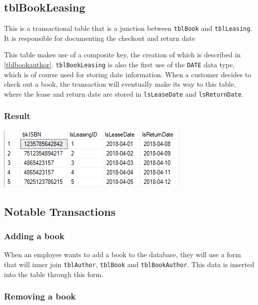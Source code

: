 \documentclass[11pt,a4paper]{scrartcl}
\begin{document}
	\subsection{tblBookLeasing}\label{tblbookleasing}
	
	This is a transactional table that is a junction between \texttt{tblBook} and \texttt{tblLeasing}. It is responsible for documenting the checkout and return date 
	
	
	
	This table makes use of a composite key, the creation of which is described in \ref{tblbookauthor}. \texttt{tblBookLeasing} is also the first use of the \texttt{DATE} data type, which is of course used for storing date information. When a customer decides to check out a book, the transaction will eventually make its way to this table, where the lease and return date are stored in \texttt{lsLeaseDate} and \texttt{lsReturnDate}.
	
	\subsubsection*{Result}
	
	\begin{center}
		\includegraphics[width=0.65\linewidth]{images/BookLeasing}
	\end{center}
	
	\subsection{Notable Transactions}\label{notabletransactions}
	
	\subsubsection*{Adding a book}
	
	When an employee wants to add a book to the database, they will use a form that will inner join \texttt{tblAuthor}, \texttt{tblBook} and \texttt{tblBookAuthor}. This data is inserted into the table through this form.
	
	\subsubsection*{Removing a book}
	
\end{document}
